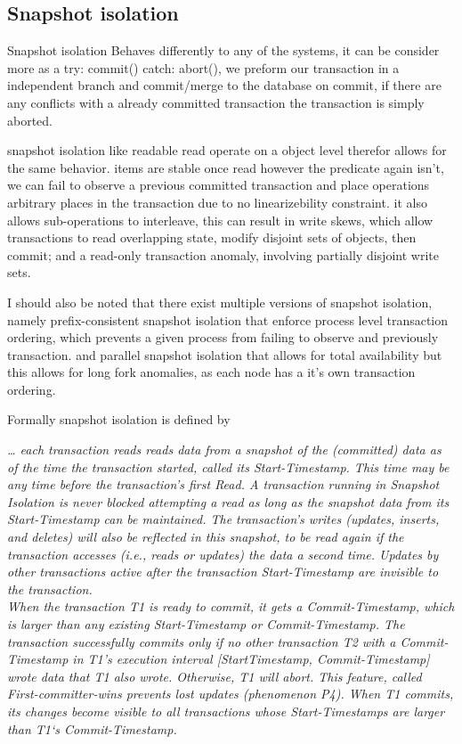 \documentclass[a4paper,10pt,titlepage]{report}
\begin{document}
\subsection{Snapshot isolation}

Snapshot isolation Behaves differently to any of the systems, it can be consider more as a try: commit() catch: abort(), we preform our transaction in a independent branch and commit/merge to the database on commit, if there are any conflicts with a already committed transaction the transaction is simply aborted. 

snapshot isolation like readable read operate on a object level therefor allows for the same behavior. items are stable once read however the predicate again isn't, we can fail to observe a previous committed transaction and place operations arbitrary places in the transaction due to no linearizebility constraint. it also allows sub-operations to interleave, this can result in write skews, which allow transactions to read overlapping state, modify disjoint sets of objects, then commit; and a read-only transaction anomaly, involving partially disjoint write sets.


I should also be noted that there exist multiple versions of snapshot isolation, namely prefix-consistent snapshot isolation that enforce process level transaction ordering, which prevents a given process from failing to observe and previously transaction. and parallel snapshot isolation that allows for total availability but this allows for long fork anomalies, as each node has a it's own transaction ordering.

Formally snapshot isolation is defined by \cite{Berensonetal}

\textit{… each transaction reads reads data from a snapshot of the (committed) data as of the time the transaction started, called its Start-Timestamp. This time may be any time before the transaction’s first Read. A transaction running in Snapshot Isolation is never blocked attempting a read as long as the snapshot data from its Start-Timestamp can be maintained. The transaction’s writes (updates, inserts, and deletes) will also be reflected in this snapshot, to be read again if the transaction accesses (i.e., reads or updates) the data a second time. Updates by other transactions active after the transaction Start-Timestamp are invisible to the transaction.
\\
When the transaction T1 is ready to commit, it gets a Commit-Timestamp, which is larger than any existing Start-Timestamp or Commit-Timestamp. The transaction successfully commits only if no other transaction T2 with a Commit-Timestamp in T1’s execution interval [StartTimestamp, Commit-Timestamp] wrote data that T1 also wrote. Otherwise, T1 will abort. This feature, called First-committer-wins prevents lost updates (phenomenon P4). When T1 commits, its changes become visible to all transactions whose Start-Timestamps are larger than T1‘s Commit-Timestamp.}
\end{document}
